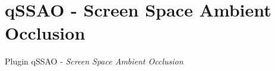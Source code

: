 \section{qSSAO - Screen Space Ambient Occlusion}
\label{subsection:qSSAO}

Plugin qSSAO - \emph{Screen Space Ambient Occlusion}